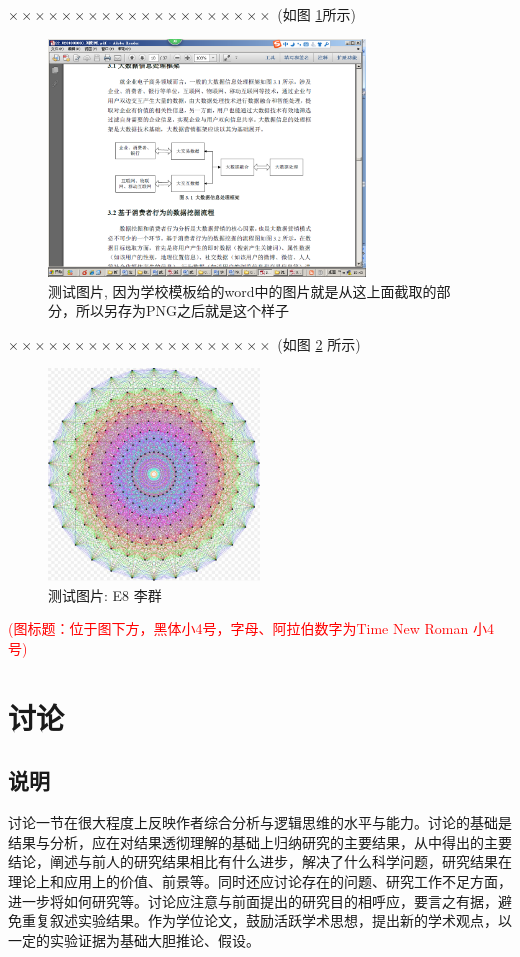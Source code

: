 \documentclass[a4paper]{article}
\theoremstyle{definition}
\theoremstyle{plain}
\theoremstyle{remark}
\newcommand{\reffig}[1]{图 \ref{#1}}
\begin{document}
$ \times\times\times\times\times\times\times\times\times\times\times\times\times\times\times\times\times\times\times\times $  (如\reffig{testfig}所示)

\begin{figure}[H]
	\centering
	\includegraphics[width=0.75\textwidth]{testmindmap}
	\caption{测试图片, 因为学校模板给的word中的图片就是从这上面截取的部分，所以另存为PNG之后就是这个样子}
	\label{testfig}
\end{figure}
$ \times\times\times\times\times\times\times\times\times\times\times\times\times\times\times\times\times\times\times\times $  (如\reffig{E8} 所示)
\begin{figure}[H]
	\centering
	\includegraphics[width=0.5\textwidth]{E8Petrie}
	\caption{测试图片: E8 李群}
	\label{E8}
\end{figure}
\textcolor{red}{(图标题：位于图下方，黑体小4号，字母、阿拉伯数字为Time New Roman 小4号)}


\section{讨论}
\subsection{说明}
讨论一节在很大程度上反映作者综合分析与逻辑思维的水平与能力。讨论的基础是结果与分析，应在对结果透彻理解的基础上归纳研究的主要结果，从中得出的主要结论，阐述与前人的研究结果相比有什么进步，解决了什么科学问题，研究结果在理论上和应用上的价值、前景等。同时还应讨论存在的问题、研究工作不足方面，进一步将如何研究等。讨论应注意与前面提出的研究目的相呼应，要言之有据，避免重复叙述实验结果。作为学位论文，鼓励活跃学术思想，提出新的学术观点，以一定的实验证据为基础大胆推论、假设。
\end{document}
